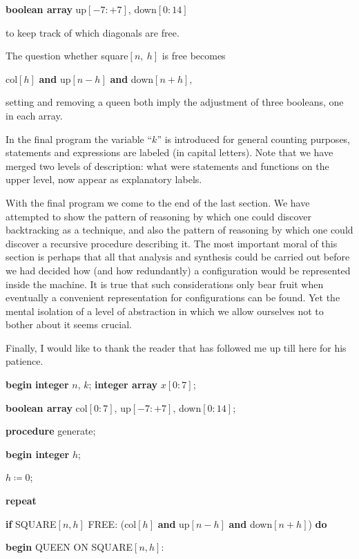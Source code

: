 \quad \textbf{boolean array} up$[-7:+7]$, down$[0:14]$

\noindent
to keep track of which diagonals are free.

The question whether square$[n,\ h]$ is free becomes

\quad col$[h]$ \textbf{and} up$[n-h]$ \textbf{and} down$[n+h]$,

\noindent
setting and removing a queen both imply the adjustment of three booleans, one in each array.

In the final program the variable ``$k$'' is introduced for general counting purposes, statements and expressions are labeled (in capital letters). Note that we have merged two levels of description: what were statements and functions on the upper level, now appear as explanatory labels.

With the final program we come to the end of the last section. We have attempted to show the pattern of reasoning by which one could discover backtracking as a technique, and also the pattern of reasoning by which one could discover a recursive procedure describing it. The most important moral of this section is perhaps that all that analysis and synthesis could be carried out before we had decided how (and how redundantly) a configuration would be represented inside the machine. It is true that such considerations only bear fruit when eventually a convenient representation for configurations can be found. Yet the mental isolation of a level of abstraction in which we allow ourselves not to bother about it seems crucial.

Finally, I would like to thank the reader that has followed me up till here for his patience.
\bigskip

\noindent
\textbf{begin} \textbf{integer} $n$, $k$; \textbf{integer array} $x[0:7]$;

\noindent
\quad \quad \textbf{boolean array} col$[0:7]$, up$[-7:+7]$, down$[0:14]$;

\noindent
\quad \textbf{procedure} generate;

\noindent
\quad \textbf{begin integer} $h$;

\noindent
\quad \quad $h \coloneq 0$;

\noindent
\quad \quad \textbf{repeat}

\noindent
\quad \quad \quad \textbf{if} SQUARE$[n,h]$ FREE: (col$[h]$ \textbf{and} up$[n-h]$ \textbf{and} down$[n+h]$) \textbf{do}

\noindent
\quad \quad \quad \textbf{begin} QUEEN ON SQUARE$[n,h]$:

